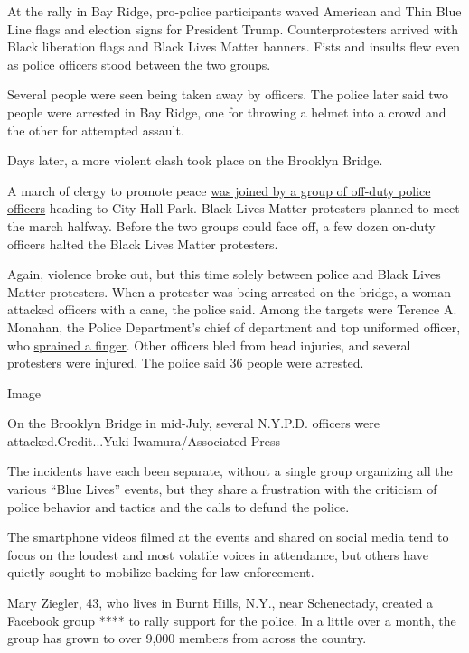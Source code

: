 At the rally in Bay Ridge, pro-police participants waved American and
Thin Blue Line flags and election signs for President Trump.
Counterprotesters arrived with Black liberation flags and Black Lives
Matter banners. Fists and insults flew even as police officers stood
between the two groups.

Several people were seen being taken away by officers. The police later
said two people were arrested in Bay Ridge, one for throwing a helmet
into a crowd and the other for attempted assault.

Days later, a more violent clash took place on the Brooklyn Bridge.

A march of clergy to promote peace
\href{https://gothamist.com/news/blue-lives-matter-protesters-and-nypd-hijacked-black-led-prayer-march-organizers-say}{was
joined by a group of off-duty police officers} heading to City Hall
Park. Black Lives Matter protesters planned to meet the march halfway.
Before the two groups could face off, a few dozen on-duty officers
halted the Black Lives Matter protesters.

Again, violence broke out, but this time solely between police and Black
Lives Matter protesters. When a protester was being arrested on the
bridge, a woman attacked officers with a cane, the police said. Among
the targets were Terence A. Monahan, the Police Department's chief of
department and top uniformed officer, who
\href{https://www.nytimes3xbfgragh.onion/2020/07/15/nyregion/terence-monahan-chief-injured.html}{sprained
a finger}. Other officers bled from head injuries, and several
protesters were injured. The police said 36 people were arrested.

Image

On the Brooklyn Bridge in mid-July, several N.Y.P.D. officers were
attacked.Credit...Yuki Iwamura/Associated Press

The incidents have each been separate, without a single group organizing
all the various ``Blue Lives'' events, but they share a frustration with
the criticism of police behavior and tactics and the calls to defund the
police.

The smartphone videos filmed at the events and shared on social media
tend to focus on the loudest and most volatile voices in attendance, but
others have quietly sought to mobilize backing for law enforcement.

Mary Ziegler, 43, who lives in Burnt Hills, N.Y., near Schenectady,
created a Facebook group **** to rally support for the police. In a
little over a month, the group has grown to over 9,000 members from
across the country.

